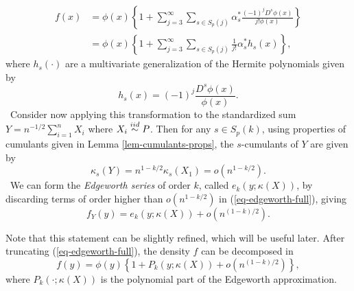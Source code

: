 \begin{align}
    f(x) 
    &= \phi(x) \left\{ 1 + \sum_{j=3}^\infty 
    \sum_{s \in S_p(j)}
    \alpha^*_s \frac{(-1)^j D^s \phi(x)}{j! \phi(x)}\right\} \nonumber \\
    &= \phi(x) \left\{
        1 + \sum_{j=3}^\infty  \sum_{s \in S_p(j)} \frac{1}{j!}\alpha^*_s h_s(x)
    \right\}, \label{eq-edgeworth-full}
\end{align} 
where $h_s(\cdot)$ are a multivariate generalization of the Hermite polynomials given by
\begin{equation*}
    h_s(x) = (-1)^j \frac{D^s \phi(x)}{\phi(x)}.
\end{equation*}
\
Consider now applying this transformation to the standardized sum $Y = n^{-1/2}\sum_{i=1}^n X_i$ where $X_i \stackrel{iid}{\sim} P$. Then for any $s \in S_p(k)$, using properties of cumulants given in Lemma \ref{lem-cumulants-props}, the $s$-cumulants of $Y$ are given by 
\begin{equation*}
    \kappa_s(Y) = n^{1-k/2} \kappa_s(X_1) = o(n^{1-k/2}).
\end{equation*}
\
We can form the \textit{Edgeworth series} of order $k$, called $e_k(y; \kappa(X))$, by discarding terms of order higher than $o(n^{1-k/2})$ in (\ref{eq-edgeworth-full}), giving
\begin{equation} \label{eq-edgeworth}
    f_Y(y) = e_k(y; \kappa(X)) + o(n^{(1-k)/2}).
\end{equation}

Note that this statement can be slightly refined, which will be useful later. After truncating (\ref{eq-edgeworth-full}), the density $f$ can be decomposed in
\begin{equation} \label{eq-edge-polynomial}
    f(y) = \phi(y)\left\{1 + P_k(y; \kappa(X)) + o(n^{(1-k)/2})\right\},
\end{equation}
where $P_k(\cdot; \kappa(X))$ is the polynomial part of the Edgeworth approximation.

